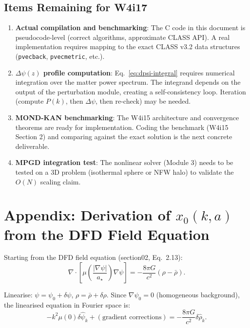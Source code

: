 \documentclass[11pt]{article}
\theoremstyle{definition}
\theoremstyle{remark}
\newcommand{\astar}{a_\star}
\newcommand{\Dpsi}{\Delta\psi}
\begin{document}
\subsection{Items Remaining for W4i17}

\begin{enumerate}
\item \textbf{Actual compilation and benchmarking}: The C code in this
  document is pseudocode-level (correct algorithms, approximate CLASS
  API). A real implementation requires mapping to the exact CLASS v3.2
  data structures (\texttt{pvecback}, \texttt{pvecmetric}, etc.).

\item \textbf{$\Dpsi(z)$ profile computation}: Eq.~\eqref{eq:dpsi-integral}
  requires numerical integration over the matter power spectrum. The
  integrand depends on the output of the perturbation module, creating
  a self-consistency loop. Iteration (compute $P(k)$, then $\Dpsi$,
  then re-check) may be needed.

\item \textbf{MOND-KAN benchmarking}: The W4i15 architecture and
  convergence theorems are ready for implementation. Coding the
  benchmark (W4i15 Section 2) and comparing against the exact
  solution is the next concrete deliverable.

\item \textbf{MPGD integration test}: The nonlinear solver (Module 3)
  needs to be tested on a 3D problem (isothermal sphere or NFW halo)
  to validate the $O(N)$ scaling claim.
\end{enumerate}


\section*{Appendix: Derivation of $x_0(k,a)$ from the DFD Field Equation}
\label{app:x0-derivation}

Starting from the DFD field equation (section02, Eq.~2.13):
\begin{equation}
  \nabla \cdot \left[\mu\!\left(\frac{|\nabla\psi|}{\astar}\right)
  \nabla\psi\right] = -\frac{8\pi G}{c^2}(\rho - \bar\rho).
\end{equation}

Linearise: $\psi = \psi_0 + \delta\psi$, $\rho = \bar\rho + \delta\rho$.
Since $\nabla\psi_0 = 0$ (homogeneous background), the linearised equation
in Fourier space is:
\begin{equation}
  -k^2 \mu(0) \delta\hat\psi_k + (\text{gradient corrections})
  = -\frac{8\pi G}{c^2}\delta\hat\rho_k.
\end{equation}
\end{document}

